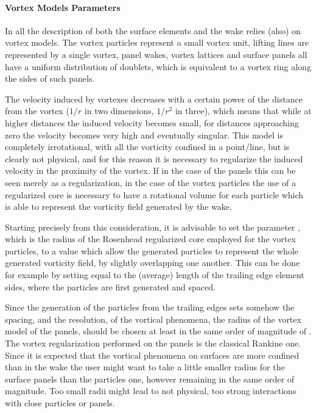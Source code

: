 \paragraph{Vortex Models Parameters}

In \DUST{} all the description of both the surface elements and 
the wake relies (also) on vortex models. The vortex particles 
represent a small vortex unit, lifting lines are represented by 
a single vortex, panel wakes, vortex lattices and surface panels 
all have a uniform distribution of doublets, which is equivalent 
to a vortex ring along the sides of such panels. 

The velocity induced by vortexes decreases with a certain power 
of the distance from the vortex ($1/r$ in two dimensions, $1/r^2$ in three), 
which means that while at higher distances the induced velocity becomes 
small, for distances approaching zero the velocity becomes very high 
and eventually singular. This model is completely irrotational, with 
all the vorticity confined in a point/line, but is clearly not physical, 
and for this reason it is necessary to regularize the induced velocity 
in the proximity of the vortex. If in the case of the panels this can 
be seen merely as a regularization, in the case of the vortex particles 
the use of a regularized core is necessary to have a rotational volume 
for each particle which is able to represent the vorticity field generated 
by the wake. 

Starting precisely from this consideration, it is advisable to set the 
parameter , which is the radius of the Rosenhead 
regularized core employed for the vortex particles, to a value which
allow the generated particles to represent the whole generated vorticity 
field, by slightly overlapping one another. This can be done for example 
by setting  equal to the (average) length of the trailing 
edge element sides, where the particles are first generated and spaced.

Since the generation of the particles from the trailing edges sets somehow 
the spacing, and the resolution, of the vortical phenomena, the radius of 
the vortex model of the panels,  should be chosen at least 
in the same order of magnitude of . The vortex 
regularization performed on the panels is the classical Rankine one. 
Since it is expected that the vortical phenomena on surfaces are more 
confined than in the wake the user might want to take a little smaller 
radius for the surface panels than the particles one, however remaining 
in the same order of magnitude. Too small radii might lead to not physical, 
too strong interactions with close particles or panels.

